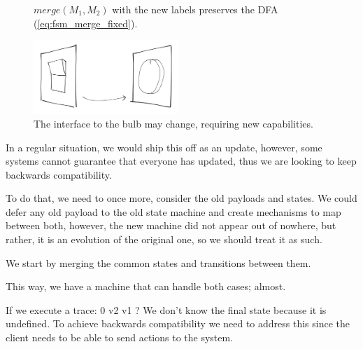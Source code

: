 \documentclass[a4paper]{article}
\begin{document}
\begin{figure}[ht]
    \centering
    \caption{$merge(M_1, M_2)$  with the new labels preserves the DFA (\autoref{eq:fsm_merge_fixed}).}
    \label{fig:bulb_fsm_merge_dfa}
\end{figure}


\begin{figure}[ht]
    \centering
    \includegraphics*[width=5.5cm]{toggle_to_potentiometer}
    \caption{The interface to the bulb may change, requiring new capabilities.}
    \label{fig:to_potentiometer}
\end{figure}

In a regular situation, we would ship this off as an update, however, some systems
cannot guarantee that everyone has updated, thus we are looking to keep backwards compatibility.

To do that, we need to once more, consider the old payloads and states.
We could defer any old payload to the old state machine and create mechanisms to map between both,
however, the new machine did not appear out of nowhere, but rather, it is an evolution
of the original one, so we should treat it as such.

We start by merging the common states and transitions between them.


This way, we have a machine that can handle both cases; almost.

If we execute a trace: 0 \-v2 \-v1\> ?
We don't know the final state because it is undefined. To achieve backwards compatibility
we need to address this since the client needs to be able to send actions to the system.
\end{document}
